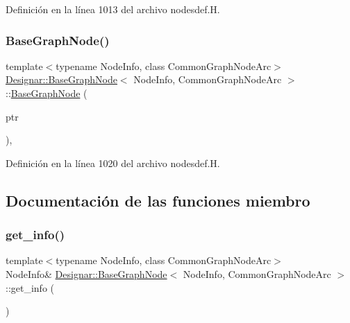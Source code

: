 Definición en la línea 1013 del archivo nodesdef.\+H.

\mbox{\label{class_designar_1_1_base_graph_node_aa64ba400e5d1fff18b7fb10071e7b97c}} 
\subsubsection{\texorpdfstring{Base\+Graph\+Node()}{BaseGraphNode()}\hspace{0.1cm}{\footnotesize\ttfamily [4/4]}}
{\footnotesize\ttfamily template$<$typename Node\+Info, class Common\+Graph\+Node\+Arc$>$ \\
\hyperlink{class_designar_1_1_base_graph_node}{Designar\+::\+Base\+Graph\+Node}$<$ Node\+Info, Common\+Graph\+Node\+Arc $>$\+::\hyperlink{class_designar_1_1_base_graph_node}{Base\+Graph\+Node} (\begin{DoxyParamCaption}\item[{\hyperlink{class_designar_1_1_base_graph_node}{Base\+Graph\+Node}$<$ Node\+Info, Common\+Graph\+Node\+Arc $>$ $\ast$}]{ptr }\end{DoxyParamCaption})\hspace{0.3cm}{\ttfamily [inline]}, {\ttfamily [protected]}}



Definición en la línea 1020 del archivo nodesdef.\+H.



\subsection{Documentación de las funciones miembro}
\mbox{\label{class_designar_1_1_base_graph_node_a5626bf91fcef0dd6f29dc503c33ecfc9}} 
\subsubsection{\texorpdfstring{get\+\_\+info()}{get\_info()}\hspace{0.1cm}{\footnotesize\ttfamily [1/2]}}
{\footnotesize\ttfamily template$<$typename Node\+Info, class Common\+Graph\+Node\+Arc$>$ \\
Node\+Info\& \hyperlink{class_designar_1_1_base_graph_node}{Designar\+::\+Base\+Graph\+Node}$<$ Node\+Info, Common\+Graph\+Node\+Arc $>$\+::get\+\_\+info (\begin{DoxyParamCaption}{ }\end{DoxyParamCaption})\hspace{0.3cm}{\ttfamily [inline]}}



